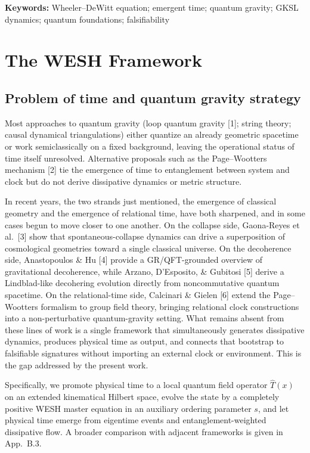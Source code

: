 \documentclass[12pt,a4paper]{article}
\numberwithin{equation}{section}
\begin{document}
\noindent\textbf{Keywords:} 
Wheeler--DeWitt equation; emergent time; quantum gravity; GKSL dynamics; quantum foundations; falsifiability

\clearpage

\section{The WESH Framework}
\label{sec:wesh-framework}

\subsection{Problem of time and quantum gravity strategy}
\vspace{0.3cm}

Most approaches to quantum gravity (loop quantum gravity [1]; string
theory; causal dynamical triangulations) either quantize an already
geometric spacetime or work semiclassically on a fixed background, leaving
the operational status of time itself unresolved. Alternative proposals such
as the Page--Wootters mechanism [2] tie the emergence
of time to entanglement between system and clock but do not derive
dissipative dynamics or metric structure. 

\noindent In recent years, the two strands just mentioned, the emergence of
classical geometry and the emergence of relational time, have both
sharpened, and in some cases begun to move closer to one another. On the
collapse side, Gaona-Reyes et al.\ [3] show that
spontaneous-collapse dynamics can drive a superposition of cosmological
geometries toward a single classical universe. On the decoherence side,
Anastopoulos \& Hu [4] provide a GR/QFT-grounded
overview of gravitational decoherence, while Arzano, D'Esposito, \&
Gubitosi [5] derive a Lindblad-like
decohering evolution directly from noncommutative quantum spacetime. On the
relational-time side, Calcinari \& Gielen [6]
extend the Page--Wootters formalism to group field theory, bringing
relational clock constructions into a non-perturbative quantum-gravity
setting. What remains absent from these lines of work is a single framework
that simultaneously generates dissipative dynamics, produces physical time
as output, and connects that bootstrap to falsifiable signatures without
importing an external clock or environment. This is the gap addressed by
the present work.

\noindent Specifically, we promote physical time to a local
quantum field operator $\hat T(x)$ on an extended kinematical Hilbert space, evolve
the state by a completely positive WESH master equation in an auxiliary
ordering parameter $s$, and let physical time emerge
from eigentime events and entanglement-weighted dissipative flow. A broader comparison with adjacent frameworks is given in
App.~B.3.
\end{document}
